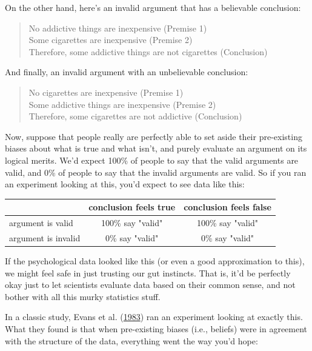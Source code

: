 \documentclass[
  11pt,
]{book}
\theoremstyle{definition}
\theoremstyle{definition}
\theoremstyle{definition}
\theoremstyle{definition}
\theoremstyle{remark}
\begin{document}
On the other hand, here's an invalid argument that has a believable conclusion:

\begin{quote}
No addictive things are inexpensive (Premise 1)\\
Some cigarettes are inexpensive (Premise 2)\\
Therefore, some addictive things are not cigarettes (Conclusion)
\end{quote}

And finally, an invalid argument with an unbelievable conclusion:

\begin{quote}
No cigarettes are inexpensive (Premise 1)\\
Some addictive things are inexpensive (Premise 2)\\
Therefore, some cigarettes are not addictive (Conclusion)
\end{quote}

Now, suppose that people really are perfectly able to set aside their pre-existing biases about what is true and what isn't, and purely evaluate an argument on its logical merits. We'd expect 100\% of people to say that the valid arguments are valid, and 0\% of people to say that the invalid arguments are valid. So if you ran an experiment looking at this, you'd expect to see data like this:

\begin{table}[H]
\centering
\begin{tabular}{lcc}
\toprule
  & conclusion feels true & conclusion feels false\\
\midrule
argument is valid & 100\% say "valid" & 100\% say "valid"\\
argument is invalid & 0\% say "valid" & 0\% say "valid"\\
\bottomrule
\end{tabular}
\end{table}

If the psychological data looked like this (or even a good approximation to this), we might feel safe in just trusting our gut instincts. That is, it'd be perfectly okay just to let scientists evaluate data based on their common sense, and not bother with all this murky statistics stuff.

In a classic study, Evans et al. (\protect\hyperlink{ref-Evans1983}{1983}) ran an experiment looking at exactly this. What they found is that when pre-existing biases (i.e., beliefs) were in agreement with the structure of the data, everything went the way you'd hope:
\end{document}
